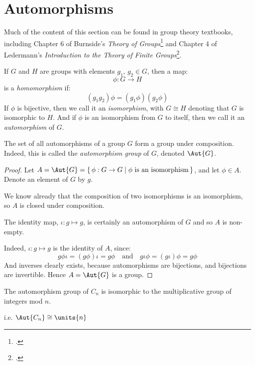 \section{Automorphisms}
Much of the content of this section can be found in group theory textbooks, including Chapter 6 of Burnside's \textit{Theory of
Groups}\footcite[Ch. 6]{burnside1911} and Chapter 4 of Ledermann's \textit{Introduction to the Theory of Finite
Groups}\footcite[Ch. 4]{ledermann1961}.
\begin{definition}
    \raggedright
    If \(G\) and \(H\) are groups with elements \(g_1,\, g_2 \in G\), then a map:
    \[\phi:G \to H\]
    is a \emph{homomorphism} if:
    \[(g_1 g_2)\phi = (g_1\phi)(g_2\phi)\]
    If \(\phi\) is bijective, then we call it an \emph{isomorphism}, with \(G \cong H\) denoting that \(G\) is
    isomorphic to \(H\).
    And if \(\phi\) is an isomorphism from \(G\) to itself, then we call it an \emph{automorphism} of
    \(G\).
\end{definition}

\begin{lemma}
    \raggedright
    The set of all automorphisms of a group \(G\) form a group under composition.
    Indeed, this is called the \emph{automorphism group} of \(G\), denoted \(\Aut{G}\).
\end{lemma}

\begin{proof}
    Let \(A = \Aut{G} = \{\,\phi:G \to G \mid \phi\ \text{is an isomorphism}\,\}\), and let \(\phi \in A\).
    Denote an element of \(G\) by \(g\).

    We know already that the composition of two isomorphisms is an isomorphism, so \(A\) is closed under composition.

    The identity map, \(\iota:g \mapsto g\), is certainly an automorphism of \(G\) and so \(A\) is non-empty.

    Indeed, \(\iota:g \mapsto g\) is the identity of \(A\), since:
    \[g\phi\iota = (g\phi)\iota = g\phi \quad \text{and} \quad g\iota\phi = (g\iota)\phi = g\phi\]
    And inverses clearly exists, because automorphisms are bijections, and bijections are invertible.
    Hence \(A = \Aut{G}\) is a group.
\end{proof}

\begin{lemma}\label{lem:aut}
    \raggedright
    The automorphism group of \(C_n\) is isomorphic to the multiplicative group
    of integers mod \(n\).

    i.e. \(\Aut{C_n} \cong \units{n}\)
\end{lemma}

